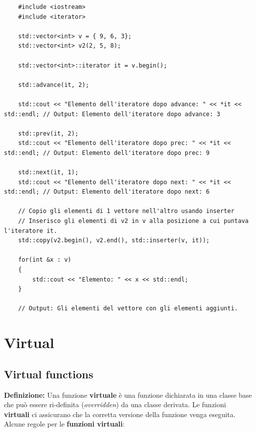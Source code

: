 \begin{lstlisting}
	#include <iostream>
	#include <iterator>
	
	std::vector<int> v = { 9, 6, 3};
	std::vector<int> v2(2, 5, 8);
	
	std::vector<int>::iterator it = v.begin();
	
	std::advance(it, 2);
	
	std::cout << "Elemento dell'iteratore dopo advance: " << *it << std::endl; // Output: Elemento dell'iteratore dopo advance: 3
	
	std::prev(it, 2);
	std::cout << "Elemento dell'iteratore dopo prec: " << *it << std::endl; // Output: Elemento dell'iteratore dopo prec: 9
	
	std::next(it, 1);
	std::cout << "Elemento dell'iteratore dopo next: " << *it << std::endl; // Output: Elemento dell'iteratore dopo next: 6
	
	// Copio gli elementi di 1 vettore nell'altro usando inserter
	// Inserisco gli elementi di v2 in v alla posizione a cui puntava l'iteratore it.
	std::copy(v2.begin(), v2.end(), std::inserter(v, it));
	
	for(int &x : v)
	{
		std::cout << "Elemento: " << x << std::endl;
	}

	// Output: Gli elementi del vettore con gli elementi aggiunti.
\end{lstlisting}



\newpage

\section{Virtual}

\subsection{Virtual functions}

\textsf{\small \textbf{Definizione:} Una funzione \textbf{virtuale} è una funzione dichiarata in una classe base che può essere ri-definita (\emph{overridden}) da una classe derivata. Le funzioni \textbf{virtuali} ci assicurano che la corretta versione della funzione venga eseguita.} \\

\textsf{\small Alcune regole per le \textbf{funzioni virtuali}: }

